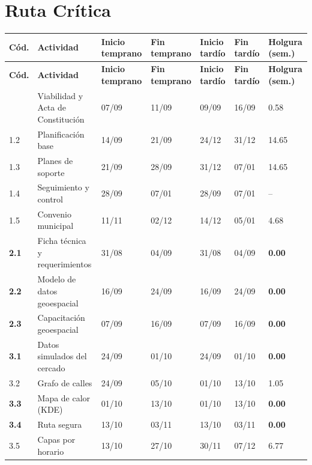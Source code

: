 \documentclass[11pt,a4paper]{article}
\begin{document}
\section{Ruta Crítica}
{\small
\setlength{\tabcolsep}{3pt}
\begin{longtable}{@{}P{0.75cm} >{\raggedright\arraybackslash}p{5.2cm} C{1.6cm} C{1.6cm} C{1.6cm} C{1.6cm} Q{1.3cm}@{}}
\toprule
{}
\textbf{Cód.} & \textbf{Actividad} & \textbf{Inicio temprano} & \textbf{Fin temprano} & \textbf{Inicio tardío} & \textbf{Fin tardío} & \textbf{Holgura (sem.)} \\
\midrule
\endfirsthead
\toprule
{}
\textbf{Cód.} & \textbf{Actividad} & \textbf{Inicio temprano} & \textbf{Fin temprano} & \textbf{Inicio tardío} & \textbf{Fin tardío} & \textbf{Holgura (sem.)} \\
\midrule
\endhead
\bottomrule
{} & Viabilidad y Acta de Constitución & 07/09 & 11/09 & 09/09 & 16/09 & 0.58 \\
1.2 & Planificación base & 14/09 & 21/09 & 24/12 & 31/12 & 14.65 \\
1.3 & Planes de soporte & 21/09 & 28/09 & 31/12 & 07/01 & 14.65 \\
1.4 & Seguimiento y control & 28/09 & 07/01 & 28/09 & 07/01 & -- \\
1.5 & Convenio municipal & 11/11 & 02/12 & 14/12 & 05/01 & 4.68 \\
\textbf{2.1} & Ficha técnica y requerimientos & 31/08 & 04/09 & 31/08 & 04/09 & \textcolor{RaciR}{\textbf{0.00}} \\
\textbf{2.2} & Modelo de datos geoespacial & 16/09 & 24/09 & 16/09 & 24/09 & \textcolor{RaciR}{\textbf{0.00}} \\
\textbf{2.3} & Capacitación geoespacial & 07/09 & 16/09 & 07/09 & 16/09 & \textcolor{RaciR}{\textbf{0.00}} \\
\textbf{3.1} & Datos simulados del cercado & 24/09 & 01/10 & 24/09 & 01/10 & \textcolor{RaciR}{\textbf{0.00}} \\
3.2 & Grafo de calles & 24/09 & 05/10 & 01/10 & 13/10 & 1.05 \\
\textbf{3.3} & Mapa de calor (KDE) & 01/10 & 13/10 & 01/10 & 13/10 & \textcolor{RaciR}{\textbf{0.00}} \\
\textbf{3.4} & Ruta segura & 13/10 & 03/11 & 13/10 & 03/11 & \textcolor{RaciR}{\textbf{0.00}} \\
3.5 & Capas por horario & 13/10 & 27/10 & 30/11 & 07/12 & 6.77 \\

\end{longtable}}
\end{document}
